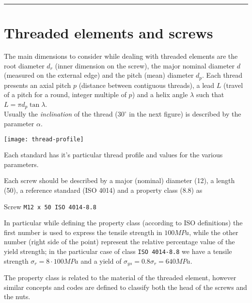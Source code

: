 \noindent
\rule{0.75\linewidth}{0.3pt}
\section{Threaded elements and screws}
\begin{multicols}{2}
	
	The main dimensions to consider while dealing with threaded elements are the root diameter $d_r$ (inner dimension on the screw), the major nominal diameter $d$ (measured on the external edge) and the pitch (mean) diameter $d_p$. Each thread presents an axial pitch $p$ (distance between contiguous threads), a lead $L$ (travel of a pitch for a round, integer multiple of $p$) and a helix angle $\lambda$ such that $L = \pi d_p \tan\lambda$.\\
	Usually the \textit{inclination} of the thread ($30^\circ$ in the next figure) is described by the parameter $\alpha$.
	
	\begin{center}
		\texttt{[image: thread-profile]}
	\end{center}
	
	Each standard has it's particular thread profile and values for the various parameters.

	Each screw should be described by a major (nominal) diameter (12), a length (50), a reference standard (ISO 4014) and a property class (8.8) as
	\begin{center}
		Screw \texttt{M12 x 50 ISO 4014-8.8}
	\end{center}
	In particular while defining the property class (according to ISO definitions) the first number is used to express the tensile strength in $100MPa$, while the other number (right side of the point) represent the relative percentage value of the yield strength; in the particular case of class \texttt{ISO 4014-8.8} we have a tensile strength $\sigma_r = 8\cdot 100 MPa$ and a yield of $\sigma_{ys}=0.8 \sigma_r = 640MPa$.
	
	The property class is related to the material of the threaded element, however similar concepts and codes are defined to classify both the head of the screws and the nuts.
	

\end{multicols}

